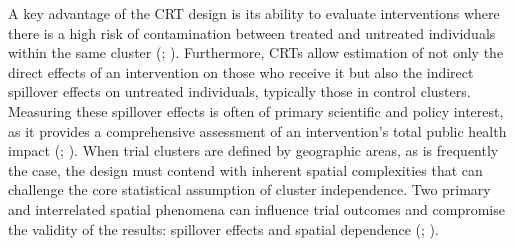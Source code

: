 \documentclass[
  12pt,
  prelim]{bios-prelim}
\begin{document}
A key advantage of the CRT design is its ability to evaluate
interventions where there is a high risk of contamination between
treated and untreated individuals within the same cluster
(;
).
Furthermore, CRTs allow estimation of not only the direct effects of an
intervention on those who receive it but also the indirect spillover
effects on untreated individuals, typically those in control clusters.
Measuring these spillover effects is often of primary scientific and
policy interest, as it provides a comprehensive assessment of an
intervention's total public health impact
(;
). When trial
clusters are defined by geographic areas, as is frequently the case, the
design must contend with inherent spatial complexities that can
challenge the core statistical assumption of cluster independence. Two
primary and interrelated spatial phenomena can influence trial outcomes
and compromise the validity of the results: spillover effects and
spatial dependence (; ).
\end{document}
